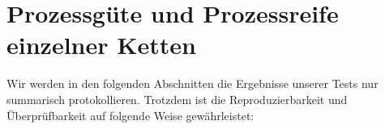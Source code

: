 %
%
%

\section{Prozessgüte und Prozessreife einzelner Ketten}

Wir werden in den folgenden Abschnitten die Ergebnisse unserer Tests nur
summarisch protokollieren. Trotzdem ist die Reproduzierbarkeit und
Überprüfbarkeit auf folgende Weise gewährleistet:

